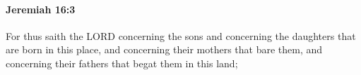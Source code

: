 
		\paragraph{Jeremiah 16:3} %
			\label{JEREMIAH-16-3}

			For thus saith the LORD concerning the sons and concerning the daughters that are born in this place, and concerning their mothers that bare them, and concerning their fathers that begat them in this land;


